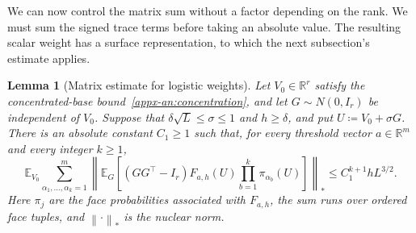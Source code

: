 \documentclass[11pt,letterpaper]{article}
\newtheorem{lemma}{Lemma}
\theoremstyle{remark}
\newcommand{\E}{\mathbb E}
\newcommand{\R}{\mathbb R}
\newcommand{\norm}[1]{\left\lVert#1\right\rVert}
\begin{document}
We can now control the matrix sum without a factor depending on the
rank. We must sum the signed trace terms before taking an absolute value.
The resulting scalar weight has a surface representation, to which
the next subsection's estimate applies.

\begin{lemma}[Matrix estimate for logistic weights]
\label{appx-an:lem:matrix}
Let \(V_0\in\R^r\) satisfy the concentrated-base
bound~\eqref{appx-an:concentration}, and let \(G\sim N(0,I_r)\) be
independent of \(V_0\). Suppose that
\(\delta\sqrt L\le\sigma\le1\) and \(h\ge\delta\), and put
\(U\coloneqq V_0+\sigma G\). There is an absolute constant
\(C_1\ge1\) such that, for every threshold vector \(a\in\R^m\)
and every integer \(k\ge1\),
\begin{equation}
 \E_{V_0}\sum_{\alpha_1,\ldots,\alpha_k=1}^m
 \left\|\E_G\left[(GG^\top-I_r)F_{a,h}(U)
              \prod_{b=1}^k\pi_{\alpha_b}(U)\right]\right\|_*
 \le C_1^{k+1}hL^{3/2}.
 \label{appx-an:matrix-bound}
\end{equation}
Here \(\pi_j\) are the face probabilities associated with
\(F_{a,h}\), the sum runs over ordered face tuples, and
\(\norm{\cdot}_*\) is the nuclear norm.
\end{lemma}
\end{document}

